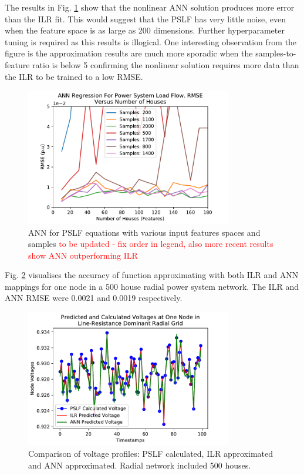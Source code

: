 \documentclass[conference]{IEEEtran}
\begin{document}
The results in Fig. \ref{fig:annresults} show that the nonlinear ANN solution produces more error than the ILR fit. This would suggest that the PSLF has very little noise, even when the feature space is as large as 200 dimensions. Further hyperparameter tuning is required as this results is illogical. One interesting observation from the figure is the approximation results are much more sporadic when the samples-to-feature ratio is below 5 confirming the nonlinear solution requires more data than the ILR to be trained to a low RMSE.

\begin{figure}[h]
	\centering
	\includegraphics[width=9cm]{annrmsevsfeatures_familyofcurves.pdf}
	\caption{ANN for PSLF equations with various input features spaces and samples \textcolor{red}{to be updated - fix order in legend, also more recent results show ANN outperforming ILR}}
	\label{fig:annresults}
\end{figure}

Fig. \ref{fig:comparison} visualises the accuracy of function approximating with both ILR and ANN mappings for one node in a 500 house radial power system network. The ILR and ANN RMSE were 0.0021 and 0.0019 respectively.

\begin{figure}[h]
	\centering
	\includegraphics[width=9cm]{comparingvoltages_500.pdf}
	\caption{Comparison of voltage profiles: PSLF calculated, ILR approximated and ANN approximated. Radial network included 500 houses.}
	\label{fig:comparison}
\end{figure}
\end{document}
